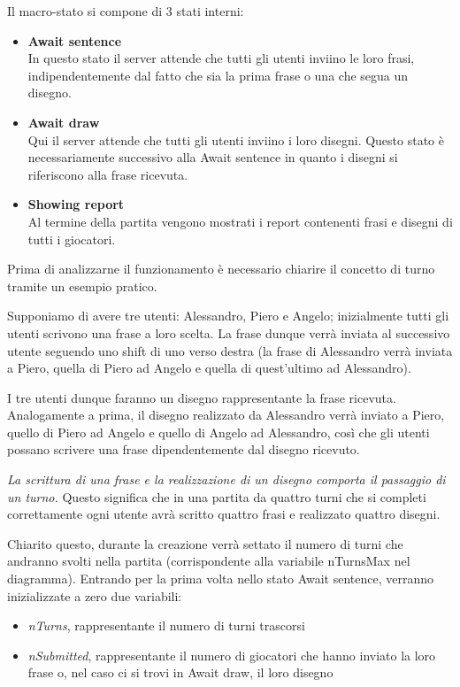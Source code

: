 \noindent Il macro-stato si compone di 3 stati interni:
\begin{itemize}
    \item {\textbf{Await sentence}}\\
    In questo stato il server attende che tutti gli utenti inviino le loro frasi, indipendentemente dal fatto che sia la prima frase o una che segua un disegno.
    \item {\textbf{Await draw}}\\
    Qui il server attende che tutti gli utenti inviino i loro disegni. Questo stato è necessariamente successivo alla Await sentence in quanto i disegni si riferiscono alla frase ricevuta.
    \item {\textbf{Showing report}}\\
    Al termine della partita vengono mostrati i report contenenti frasi e disegni di tutti i giocatori.
\end{itemize}
Prima di analizzarne il funzionamento è necessario chiarire il concetto di turno tramite un esempio pratico.\newline

\noindent Supponiamo di avere tre utenti: Alessandro, Piero e Angelo; inizialmente tutti gli utenti scrivono una frase a loro scelta. La frase dunque verrà inviata al successivo utente seguendo uno shift di uno verso destra (la frase di Alessandro verrà inviata a Piero, quella di Piero ad Angelo e quella di quest'ultimo ad Alessandro).\newline

\noindent I tre utenti dunque faranno un disegno rappresentante la frase ricevuta. Analogamente a prima, il disegno realizzato da Alessandro verrà inviato a Piero, quello di Piero ad Angelo e quello di Angelo ad Alessandro, così che gli utenti possano scrivere una frase dipendentemente dal disegno ricevuto.\newline

\noindent \emph{La scrittura di una frase e la realizzazione di un disegno  comporta il passaggio di un turno.} Questo significa che in una partita da quattro turni che si completi correttamente ogni utente avrà scritto quattro frasi e realizzato quattro disegni.\newline

\noindent Chiarito questo, durante la creazione verrà settato il numero di turni che andranno svolti nella partita (corrispondente alla variabile nTurnsMax nel diagramma).\newline
Entrando per la prima volta nello stato Await sentence, verranno inizializzate a zero due variabili:
\begin{itemize}
    \item \emph{nTurns}, rappresentante il numero di turni trascorsi
    \item \emph{nSubmitted}, rappresentante il numero di giocatori che hanno inviato la loro frase o, nel caso ci si trovi in Await draw, il loro disegno
\end{itemize}


